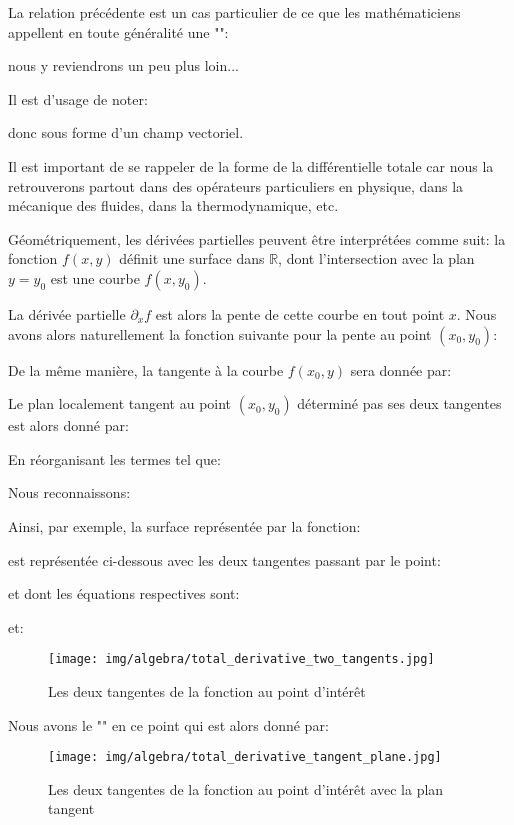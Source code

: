 	La relation précédente est un cas particulier de ce que les mathématiciens appellent en toute généralité une "":
	
	nous y reviendrons un peu plus loin... 
	
	Il est d'usage de noter:
	
	donc sous forme d'un champ vectoriel.
	
	Il est important de se rappeler de la forme de la différentielle totale car nous la retrouverons partout dans des opérateurs particuliers en physique, dans la mécanique des fluides, dans la thermodynamique, etc.
	
	Géométriquement, les dérivées partielles peuvent être interprétées comme suit: la fonction $f(x, y)$ définit une surface dans $\mathbb{R}$, dont l'intersection avec la plan $y=y_0$ est une courbe $f(x,y_0)$.
	
	La dérivée partielle $\partial_x f$  est alors la pente de cette courbe en tout point $x$. Nous avons alors naturellement la fonction suivante pour la pente au point $(x_0,y_0)$:
	
	De la même manière, la tangente à la courbe $f(x_0,y)$ sera donnée par:
	
	Le plan localement tangent au point $(x_0,y_0)$ déterminé pas ses deux tangentes est alors donné par:
	
	En réorganisant les termes tel que:
	
	Nous reconnaissons:
	
	Ainsi, par exemple, la surface représentée par la fonction:
	
	est représentée ci-dessous avec les deux tangentes passant par le point:
	
	et dont les équations respectives sont:
	
	et:
	
	\begin{figure}[H]
		\centering
		\texttt{[image: img/algebra/total\_derivative\_two\_tangents.jpg]}
		\caption[]{Les deux tangentes de la fonction au point d'intérêt}
	\end{figure}
	Nous avons le "" en ce point qui est alors donné par:
		
	\begin{figure}[H]
		\centering
		\texttt{[image: img/algebra/total\_derivative\_tangent\_plane.jpg]}
		\caption[]{Les deux tangentes de la fonction au point d'intérêt avec la plan tangent}
	\end{figure}
	
